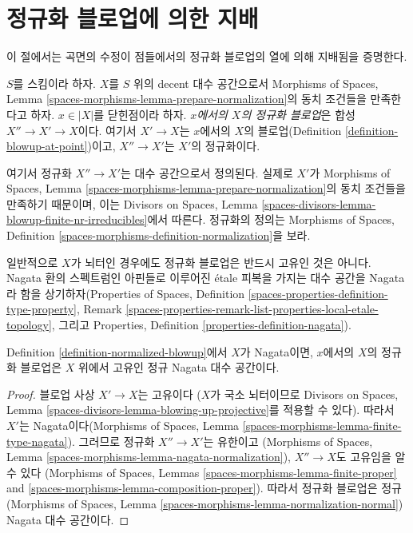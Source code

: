 \section{정규화 블로업에 의한 지배}
\label{section-normalized-blowups}

\noindent
이 절에서는 곡면의 수정이 점들에서의 정규화 블로업의 열에 의해
지배됨을 증명한다.

\begin{definition}
\label{definition-normalized-blowup}
$S$를 스킴이라 하자. $X$를 $S$ 위의 decent 대수 공간으로서
Morphisms of Spaces, Lemma
\ref{spaces-morphisms-lemma-prepare-normalization}의 동치 조건들을
만족한다고 하자. $x \in |X|$를 닫힌점이라 하자.
{\it $x$에서의 $X$의 정규화 블로업}은 합성
$X'' \to X' \to X$이다. 여기서 $X' \to X$는
$x$에서의 $X$의 블로업(Definition \ref{definition-blowup-at-point})이고,
$X'' \to X'$는 $X'$의 정규화이다.
\end{definition}

\noindent
여기서 정규화 $X'' \to X'$는 대수 공간으로서 정의된다.
실제로 $X'$가 Morphisms of Spaces, Lemma
\ref{spaces-morphisms-lemma-prepare-normalization}의 동치 조건들을
만족하기 때문이며, 이는 Divisors on Spaces, Lemma
\ref{spaces-divisors-lemma-blowup-finite-nr-irreducibles}에서 따른다.
정규화의 정의는 Morphisms of Spaces, Definition
\ref{spaces-morphisms-definition-normalization}을 보라.

\medskip\noindent
일반적으로 $X$가 뇌터인 경우에도 정규화 블로업은 반드시 고유인 것은 아니다.
Nagata 환의 스펙트럼인 아핀들로 이루어진 \'etale 피복을 가지는 대수 공간을
Nagata라 함을 상기하자(Properties of Spaces, Definition
\ref{spaces-properties-definition-type-property}, Remark
\ref{spaces-properties-remark-list-properties-local-etale-topology}, 그리고
Properties, Definition \ref{properties-definition-nagata}).

\begin{lemma}
\label{lemma-Nagata-normalized-blowup}
Definition \ref{definition-normalized-blowup}에서 $X$가 Nagata이면,
$x$에서의 $X$의 정규화 블로업은 $X$ 위에서 고유인
정규 Nagata 대수 공간이다.
\end{lemma}

\begin{proof}
블로업 사상 $X' \to X$는 고유이다
($X$가 국소 뇌터이므로 Divisors on Spaces, Lemma
\ref{spaces-divisors-lemma-blowing-up-projective}를 적용할 수 있다).
따라서 $X'$는 Nagata이다(Morphisms of Spaces, Lemma
\ref{spaces-morphisms-lemma-finite-type-nagata}).
그러므로 정규화 $X'' \to X'$는 유한이고
(Morphisms of Spaces, Lemma
\ref{spaces-morphisms-lemma-nagata-normalization}),
$X'' \to X$도 고유임을 알 수 있다
(Morphisms of Spaces, Lemmas
\ref{spaces-morphisms-lemma-finite-proper} and
\ref{spaces-morphisms-lemma-composition-proper}).
따라서 정규화 블로업은 정규(Morphisms of Spaces, Lemma
\ref{spaces-morphisms-lemma-normalization-normal}) Nagata 대수 공간이다.
\end{proof}

